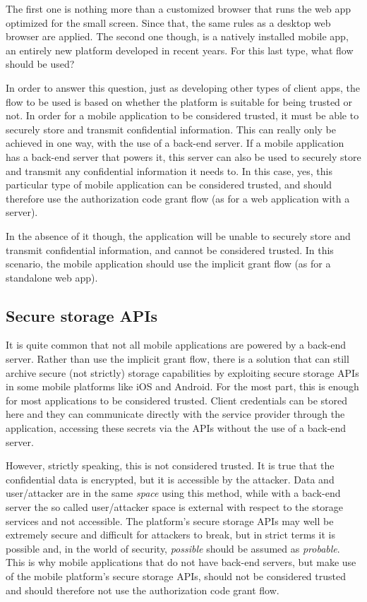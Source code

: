 The first one is nothing more than a customized browser that runs the web app optimized for the small screen. Since that, the same rules as a desktop web browser are applied.
The second one though, is a natively installed mobile app, an entirely new platform developed in recent years. For this last type, what flow should be used? 

In order to answer this question, just as developing other types of client apps, the flow to be used is based on whether the platform is suitable for being trusted or not. In order for a mobile application to be considered trusted, it must be able to securely store and transmit confidential information. This can really only be achieved in
one way, with the use of a back-end server. If a mobile application has a back-end server that powers it, this server can also be used to securely store and transmit any confidential information it needs to. In this case, yes, this particular type of mobile application can be considered trusted, and should therefore use the authorization code grant flow (as for a web application with a server). 

In the absence of it though, the application will be unable to securely store and transmit confidential information, and cannot be considered trusted. In this scenario, the mobile application should use the implicit grant flow (as for a standalone web app).

\subsection{Secure storage APIs}
It is quite common that not all mobile applications are powered by a back-end server. Rather than use the implicit grant flow, there is a solution that can still archive secure (not strictly) storage capabilities by exploiting secure storage APIs in some mobile platforms like iOS and Android.  For the most part, this is enough for most applications to be considered trusted. Client credentials can be stored here and they can communicate directly with the service provider through the application, accessing these secrets via the APIs without the use of a back-end server.

However, strictly speaking, this is not considered trusted. It is true that the confidential data is encrypted, but it is accessible by the attacker. Data and user/attacker are in the same \textit{space} using this method, while with a back-end server the so called user/attacker space is external with respect to the storage services and not accessible. The platform's secure storage APIs may well be extremely secure and difficult for attackers to break, but in strict terms it is possible and, in the world of security, \textit{possible} should be assumed as \textit{probable}. This is why mobile applications that do not have back-end servers, but make use of the mobile platform's secure storage APIs, should not be considered trusted and should therefore not use the authorization code grant flow.

